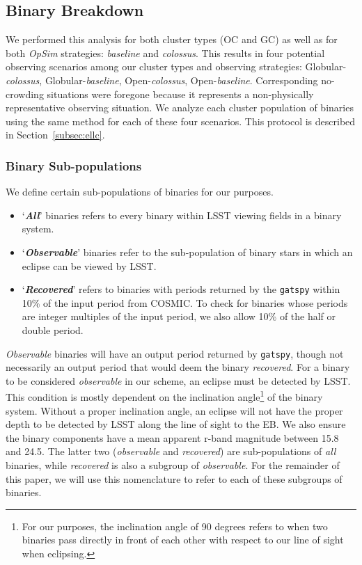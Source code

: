 \documentclass[twocolumn]{aastex63}
\begin{document}
\subsection{Binary Breakdown}
\label{subsec: BinaryBreakdown}
We performed this analysis for both cluster types (OC and GC) as well as for both \textit{OpSim} strategies: \textit{baseline} and \textit{colossus}. %
This results in four potential observing scenarios among our cluster types and observing strategies: Globular-\textit{colossus}, Globular-\textit{baseline}, Open-\textit{colossus}, Open-\textit{baseline}. Corresponding no-crowding situations were foregone because it represents a non-physically representative observing situation. We analyze each cluster population of binaries using the same method for each of these four scenarios. This protocol is described in Section~\ref{subsec:ellc}.

\subsubsection{Binary Sub-populations}
We define certain sub-populations of binaries for our purposes.

\begin{itemize}
    \item ‘\textbf{\textit{All}}’ binaries refers to every binary within LSST viewing fields in a binary system.
    \item ‘\textbf{\textit{Observable}}’ binaries refer to the sub-population of binary stars in which an eclipse can be viewed by LSST. 
    \item ‘\textbf{\textit{Recovered}}’ refers to binaries with periods returned by the \texttt{gatspy} within 10\% of the input period from COSMIC. To check for binaries whose periods are integer multiples of the input period, we also allow 10\% of the half or double period. 
\end{itemize}

\textit{Observable} binaries will have an output period returned by \texttt{gatspy}, though not necessarily an output period that would deem the binary \textit{recovered}. For a binary to be considered \textit{observable} in our scheme, an eclipse must be detected by LSST. This condition is mostly dependent on the inclination angle\footnote{For our purposes, the inclination angle of 90 degrees refers to when two binaries pass directly in front of each other with respect to our line of sight when eclipsing.} of the binary system. Without a proper inclination angle, an eclipse will not have the proper depth to be detected by LSST along the line of sight to the EB. We also ensure the binary components have a mean apparent r-band magnitude between 15.8 and 24.5. The latter two (\textit{observable} and \textit{recovered}) are sub-populations of \textit{all} binaries, while \textit{recovered} is also a subgroup of \textit{observable}. For the remainder of this paper, we will use this nomenclature to refer to each of these subgroups of binaries.
\end{document}
